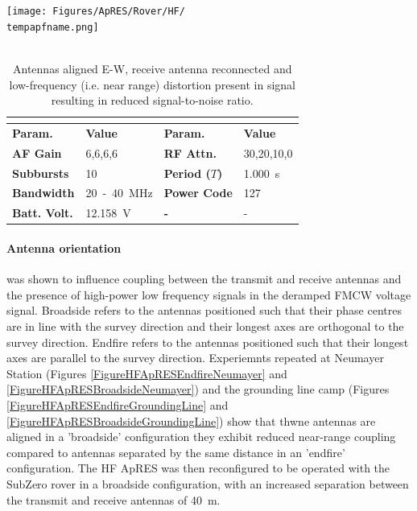 \documentclass[a4paper,12pt]{article}
\newcommand{\apresdoc}[9]{
    \def\tempapfname{#1}
    \def\tempaploc{#2}
    \def\tempapcom{#3}
    \def\temptimestamp{#4}
    \def\tempafgain{#5}
    \def\temprfattn{#6}
    \def\tempperiod{#7}
    \def\tempflow{#8}
    \def\tempfupp{#9}
    \apresdoccont
}
\newcommand{\apresdoccont}[6]{
  \def\tempnatt{#1}
  \def\tempnchirp{#2}
  \def\tempnsubburst{#3}
  \def\temppowercode{#4}
  \def\tempbattvolt{#5}
  \def\tempaplbl{#6}

  \begin{table}
    \caption{\tempapcom}
    \rowcolors{2}{gray!25}{white}
    \centering
    \texttt{[image: Figures/ApRES/Rover/HF/\\tempapfname.png]}
    \\
    ~\\
    \begin{tabular}{>{\bfseries}l l >{\bfseries}l l}
      \hline
      \rowcolor{gray!50}
      \multicolumn{4}{c}{\textbf{Filename} \tempapfname} \\
      \hline
      Param. & \bfseries Value & Param. & \bfseries Value \\
      AF Gain & \tempafgain &
      RF Attn. & \temprfattn \\
      Subbursts & \tempnsubburst &
      Period ($T$) & \tempperiod~s \\
      Bandwidth & \tempflow~-~\tempfupp~MHz &
      Power Code & \temppowercode \\
      Batt. Volt. & \tempbattvolt~V &
      - & - \\
      \hline
    \end{tabular}
    \label{\tempaplbl}
  \end{table}
}
\begin{document}
\apresdoc
{2021-12-28-214326.dat}
{Neumayer III}
{Antennas aligned E-W, receive antenna reconnected and low-frequency (i.e. near
range) distortion present in signal resulting in reduced signal-to-noise ratio.}
{2021-12-28 21:43:26.000}
{6,6,6,6}
{30,20,10,0}
{1.000}
{20}
{40}
{4}
{40}
{10}
{127}
{12.158}
{FigureHFApRESReconnectedAntenna}

\paragraph*{Antenna orientation} was shown to influence coupling between
the transmit and receive antennas and the presence of high-power low frequency
signals in the deramped FMCW voltage signal.  Broadside refers to the antennas
positioned such that their phase centres are in line with the survey direction
and their longest axes are orthogonal to the survey direction.  Endfire refers
to the antennas positioned such that their longest axes are parallel to the
survey direction.  Experiemnts repeated at Neumayer Station (Figures
\ref{FigureHFApRESEndfireNeumayer} and \ref{FigureHFApRESBroadsideNeumayer}) and
the grounding line camp (Figures \ref{FigureHFApRESEndfireGroundingLine} and
\ref{FigureHFApRESBroadsideGroundingLine}) show that thwne antennas are aligned
in a 'broadside' configuration they exhibit reduced near-range coupling compared
to antennas separated by the same distance in an 'endfire' configuration.  The
HF ApRES was then reconfigured to be operated with the SubZero rover in a
broadside configuration, with an increased separation between the transmit and
receive antennas of \SI{40}{\metre}.
\end{document}
